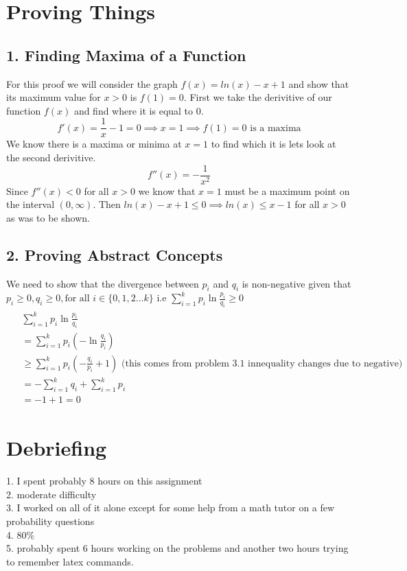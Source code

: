 \documentclass{article}
\begin{document}
\section*{Proving Things}
\subsection*{1. Finding Maxima of a Function}
For this proof we will consider the graph $f(x) = ln(x)-x+1$ and show that its maximum value for $x>0$ is $f(1)=0$. First we take the derivitive of our function $f(x)$ and find where it is equal to 0. \[f'(x)=\frac{1}{x}-1 = 0 \implies x=1 \implies f(1)=0 \text{ is a maxima}\] 
We know there is a maxima or minima at $x=1$ to find which it is lets look at the second derivitive. \[f''(x)=-\frac{1}{x^2}\]
Since $f''(x) < 0$ for all $x>0$ we know that $x=1$ must be a maximum point on the interval $(0,\infty)$. Then $ln(x)-x+1 \leq 0 \implies ln(x) \leq x-1$ for all $x>0$ as was to be shown.

\subsection*{2. Proving Abstract Concepts}
We need to show that the divergence between $p_i$ and $q_i$ is non-negative given that $p_i \geq 0, q_i \geq 0, \text{for all } i \in \{0,1,2 \dots k\}$ 
i.e $\sum_{i=1}^{k}p_i\ln{\frac{p_i}{q_i}} \geq 0$
\begin{align*}
\begin{split}
  &\sum_{i=1}^{k}p_i\ln{\frac{p_i}{q_i}} \\ 
  &= \sum_{i=1}^{k}p_i(-\ln{\frac{q_i}{p_i}}) \\
  &\geq \sum_{i=1}^{k}p_i(-{\frac{q_i}{p_i}+1}) \text{         (this comes from problem 3.1 innequality changes due to negative)} \\
  &=-\sum_{i=1}^{k}q_i + \sum_{i=1}^{k}p_i \\
  &=-1+1=0
\end{split}
\end{align*}
  

\section*{Debriefing}
1. I spent probably 8 hours on this assignment \\
2. moderate difficulty\\
3. I worked on all of it alone except for some help from a math tutor on a few probability questions \\
4. 80\% \\
5. probably spent 6 hours working on the problems and another two hours trying to remember latex commands.
\end{document}
